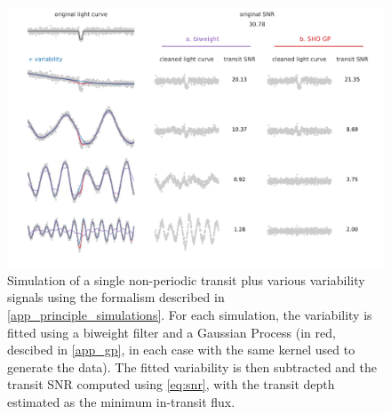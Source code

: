 \documentclass{aastex631}
\begin{document}
\begin{figure}[H]
    \begin{centering}
        \includegraphics[width=\linewidth]{../figures/issue2.pdf}
        \caption{Simulation of a single non-periodic transit plus various variability signals using the formalism described in \autoref{app_principle_simulations}. For each simulation, the variability is fitted using a biweight filter \citep[in violet]{wotan} and a Gaussian Process (in red, descibed in \autoref{app_gp}, in each case with the same kernel used to generate the data). The fitted variability is then subtracted and the transit SNR computed using \autoref{eq:snr}, with the transit depth estimated as the minimum in-transit flux.}
        \label{fig:issue2}
    \end{centering}
\end{figure}
\end{document}
